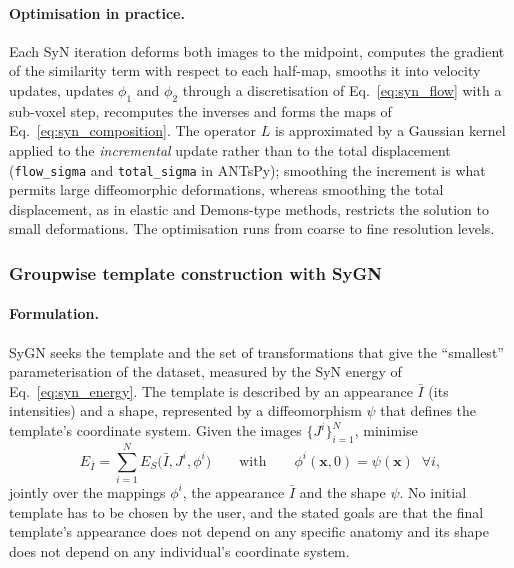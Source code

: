 \paragraph{Optimisation in practice.}  %
Each SyN iteration deforms both images to the midpoint, computes the gradient of
the similarity term with respect to each half-map, smooths it into velocity
updates, updates $\phi_1$ and $\phi_2$ through a discretisation of
Eq.~\eqref{eq:syn_flow} with a sub-voxel step, recomputes the inverses and forms
the maps of Eq.~\eqref{eq:syn_composition}. The operator $L$ is approximated by a
Gaussian kernel applied to the \emph{incremental} update rather than to the total
displacement (\texttt{flow\_sigma} and \texttt{total\_sigma} in ANTsPy);
smoothing the increment is what permits large diffeomorphic deformations,
whereas smoothing the total displacement, as in elastic and Demons-type methods,
restricts the solution to small deformations. The optimisation runs from coarse
to fine resolution levels.

\subsubsection{Groupwise template construction with SyGN}
\label{sec:sygn}                 %

\paragraph{Formulation.}  %
SyGN seeks the template and the set of transformations that give the
``smallest'' parameterisation of the dataset, measured by the SyN energy of
Eq.~\eqref{eq:syn_energy}. The template is described by an appearance $\bar I$
(its intensities) and a shape, represented by a diffeomorphism $\psi$ that
defines the template's coordinate system. Given the images $\{J^i\}_{i=1}^N$,
\citet{avants2010sygn} minimise
\begin{equation}
  E_{\bar I} = \sum_{i=1}^{N} E_S\big(\bar I, J^i, \phi^i\big)
  \qquad\text{with}\qquad \phi^i(\mathbf{x},0) = \psi(\mathbf{x})\;\;\forall i,
  \label{eq:sygn_energy}         %
\end{equation}
jointly over the mappings $\phi^i$, the appearance $\bar I$ and the shape $\psi$.
No initial template has to be chosen by the user, and the stated goals are that
the final template's appearance does not depend on any specific anatomy and its
shape does not depend on any individual's coordinate system.

